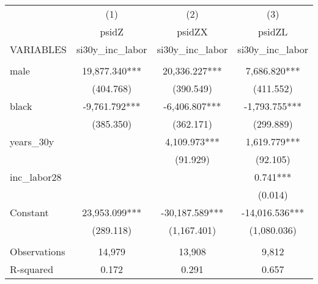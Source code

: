 \begin{tabular}{lccc} \hline
 & (1) & (2) & (3) \\
 & psidZ & psidZX & psidZL \\
VARIABLES & si30y\_inc\_labor & si30y\_inc\_labor & si30y\_inc\_labor \\ \hline
 &  &  &  \\
male & 19,877.340*** & 20,336.227*** & 7,686.820*** \\
 & (404.768) & (390.549) & (411.552) \\
black & -9,761.792*** & -6,406.807*** & -1,793.755*** \\
 & (385.350) & (362.171) & (299.889) \\
years\_30y &  & 4,109.973*** & 1,619.779*** \\
 &  & (91.929) & (92.105) \\
inc\_labor28 &  &  & 0.741*** \\
 &  &  & (0.014) \\
Constant & 23,953.099*** & -30,187.589*** & -14,016.536*** \\
 & (289.118) & (1,167.401) & (1,080.036) \\
 &  &  &  \\
Observations & 14,979 & 13,908 & 9,812 \\
 R-squared & 0.172 & 0.291 & 0.657 \\ \hline
\end{tabular}

